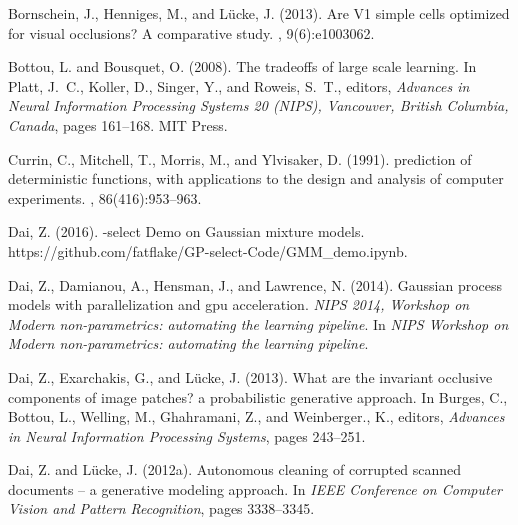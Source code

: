 \documentclass[12pt]{article}
\begin{document}
%
%
\begin{thebibliography}{}

Bornschein, J., Henniges, M., and L\"ucke, J. (2013).
\newblock Are {V}1 simple cells optimized for visual occlusions? {A}
  comparative study.
, 9(6):e1003062.

Bottou, L. and Bousquet, O. (2008).
\newblock The tradeoffs of large scale learning.
\newblock In Platt, J.~C., Koller, D., Singer, Y., and Roweis, S.~T., editors,
  {\em Advances in Neural Information Processing Systems 20 ({NIPS}),
  Vancouver, British Columbia, Canada}, pages 161--168. MIT Press.

Currin, C., Mitchell, T., Morris, M., and Ylvisaker, D. (1991).
 prediction of deterministic functions, with applications
  to the design and analysis of computer experiments.
, 86(416):953--963.

Dai, Z. (2016).
-select {D}emo on {G}aussian mixture models.
\newblock https://github.com/fatflake/GP-select-Code/GMM\_demo.ipynb.

Dai, Z., Damianou, A., Hensman, J., and Lawrence, N. (2014).
\newblock Gaussian process models with parallelization and gpu acceleration.
  \textit{NIPS 2014, Workshop on Modern non-parametrics: automating the
  learning pipeline}.
\newblock In {\em NIPS Workshop on Modern non-parametrics: automating the
  learning pipeline}.

Dai, Z., Exarchakis, G., and L{\"u}cke, J. (2013).
\newblock What are the invariant occlusive components of image patches? a
  probabilistic generative approach.
\newblock In Burges, C., Bottou, L., Welling, M., Ghahramani, Z., and
  Weinberger., K., editors, {\em Advances in Neural Information Processing
  Systems}, pages 243--251.

Dai, Z. and L\"{u}cke, J. (2012a).
\newblock Autonomous cleaning of corrupted scanned documents -- a generative
  modeling approach.
\newblock In {\em IEEE Conference on Computer Vision and Pattern Recognition},
  pages 3338--3345.


\end{thebibliography}
\end{document}
